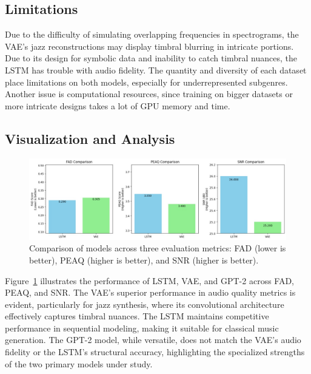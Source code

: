 \documentclass[conference]{IEEEtran}
\begin{document}
\subsection{Limitations}
Due to the difficulty of simulating overlapping frequencies in spectrograms, the VAE's jazz reconstructions may display timbral blurring in intricate portions.  Due to its design for symbolic data and inability to catch timbral nuances, the LSTM has trouble with audio fidelity.  The quantity and diversity of each dataset place limitations on both models, especially for underrepresented subgenres.  Another issue is computational resources, since training on bigger datasets or more intricate designs takes a lot of GPU memory and time.

\subsection{Visualization and Analysis}
\begin{figure}[h]
    \centering
    \includegraphics[width=\linewidth]{metric_comparison.jpg}
    \caption{Comparison of models across three evaluation metrics: FAD (lower is better), PEAQ (higher is better), and SNR (higher is better).}
    \label{fig:metric_comparison}
\end{figure}

Figure~\ref{fig:metric_comparison} illustrates the performance of LSTM, VAE, and GPT-2 across FAD, PEAQ, and SNR. The VAE’s superior performance in audio quality metrics is evident, particularly for jazz synthesis, where its convolutional architecture effectively captures timbral nuances. The LSTM maintains competitive performance in sequential modeling, making it suitable for classical music generation. The GPT-2 model, while versatile, does not match the VAE’s audio fidelity or the LSTM’s structural accuracy, highlighting the specialized strengths of the two primary models under study.

\end{document}
